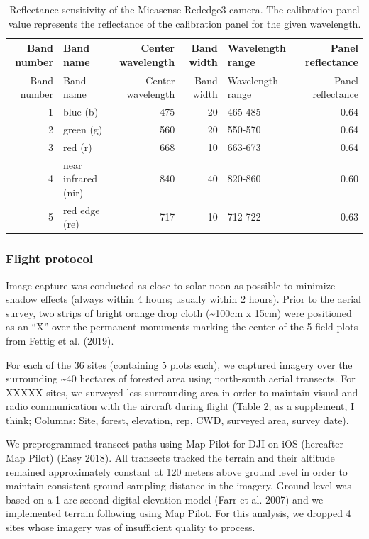 \documentclass[]{article}
\begin{document}
\begin{longtable}[]{@{}rlrrlr@{}}
\caption{Reflectance sensitivity of the Micasense Rededge3 camera. The
calibration panel value represents the reflectance of the calibration
panel for the given wavelength.}\tabularnewline
\toprule
Band number & Band name & Center wavelength & Band width & Wavelength
range & Panel reflectance\tabularnewline
\midrule
\endfirsthead
\toprule
Band number & Band name & Center wavelength & Band width & Wavelength
range & Panel reflectance\tabularnewline
\midrule
\endhead
1 & blue (b) & 475 & 20 & 465-485 & 0.64\tabularnewline
2 & green (g) & 560 & 20 & 550-570 & 0.64\tabularnewline
3 & red (r) & 668 & 10 & 663-673 & 0.64\tabularnewline
4 & near infrared (nir) & 840 & 40 & 820-860 & 0.60\tabularnewline
5 & red edge (re) & 717 & 10 & 712-722 & 0.63\tabularnewline
\bottomrule
\end{longtable}

\subsubsection{Flight protocol}\label{flight-protocol}

Image capture was conducted as close to solar noon as possible to
minimize shadow effects (always within 4 hours; usually within 2 hours).
Prior to the aerial survey, two strips of bright orange drop cloth
(\textasciitilde{}100cm x 15cm) were positioned as an ``X'' over the
permanent monuments marking the center of the 5 field plots from Fettig
et al. (2019).

For each of the 36 sites (containing 5 plots each), we captured imagery
over the surrounding \textasciitilde{}40 hectares of forested area using
north-south aerial transects. For XXXXX sites, we surveyed less
surrounding area in order to maintain visual and radio communication
with the aircraft during flight (Table 2; as a supplement, I think;
Columns: Site, forest, elevation, rep, CWD, surveyed area, survey date).

We preprogrammed transect paths using Map Pilot for DJI on iOS
(hereafter Map Pilot) (Easy 2018). All transects tracked the terrain and
their altitude remained approximately constant at 120 meters above
ground level in order to maintain consistent ground sampling distance in
the imagery. Ground level was based on a 1-arc-second digital elevation
model (Farr et al. 2007) and we implemented terrain following using Map
Pilot. For this analysis, we dropped 4 sites whose imagery was of
insufficient quality to process.
\end{document}
